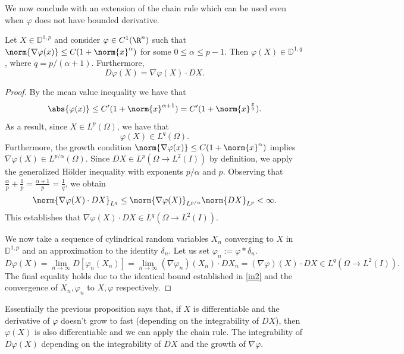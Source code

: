 \documentclass[
    a4paper,
    DIV=14,
    abstract=true,
    numbers=noenddot
]{scrartcl}
\begin{document}
We now conclude with an extension of the chain rule which can be used even when $\varphi$ does not have bounded derivative.
\begin{proposition}
	Let $X\in \mathbb{D}^{1,p}$ and consider $\varphi\in C^1(\R^n)$ such that $\norm{\nabla\varphi(x)}\leq C(1+\norm{x}^\alpha)$ for some $0\leq \alpha\leq p-1$. Then
	$\varphi(X)\in \mathbb{D}^{1,q}$, where $q=p/(\alpha+1)$. Furthermore,
	\begin{equation*}
		D\varphi(X)=\nabla \varphi(X) \cdot D X.
	\end{equation*}
\end{proposition}
\begin{proof}
    By the mean value inequality we have that
    \begin{equation*}
        \abs{\varphi(x)}\leq C'(1+\norm{x}^{\alpha+1})=C'(1+\norm{x}^{\frac{p}{q}}).
    \end{equation*}
    As a result, since $X \in L^p(\Omega)$, we have that
    \begin{equation}\label{in1}
        \varphi(X) \in L^q(\Omega).
    \end{equation}
    Furthermore, the growth condition $\norm{\nabla\varphi(x)}\leq C(1+\norm{x}^\alpha)$ implies $\nabla \varphi(X) \in L^{p/\alpha}(\Omega)$. Since $D X \in L^p(\Omega\to L^2(I))$ by definition, we apply the generalized Hölder inequality with exponents $p/\alpha$ and $p$. Observing that $\frac{\alpha}{p} + \frac{1}{p} = \frac{\alpha+1}{p} = \frac{1}{q}$, we obtain
    \begin{equation}\label{in2}
        \norm{\nabla \varphi(X) \cdot D X}_{L^q} \leq \norm{\nabla \varphi(X)}_{L^{p/\alpha}} \norm{D X}_{L^p} < \infty.
    \end{equation}
    This establishes that $\nabla \varphi(X) \cdot D X \in L^q(\Omega\to L^2(I))$.
    
    We now take a sequence of cylindrical random variables $X_n$ converging to $X$ in $\mathbb{D}^{1,p}$ and an approximation to the identity $\delta_n$. Let us set $\varphi_n:=\varphi \ast \delta_n$.
    \begin{equation*}
        D \varphi(X) = \lim_{n \to \infty} D [\varphi_n(X_n)] = \lim_{n \to \infty} (\nabla \varphi_n)(X_n)\cdot DX_n = (\nabla \varphi)(X)\cdot DX \in L^q(\Omega\to L^2(I)).
    \end{equation*}
    The final equality holds due to the identical bound established in \eqref{in2} and the convergence of $X_n,\varphi_n$ to $X,\varphi$ respectively.
\end{proof}
Essentially the previous proposition says that, if $X$ is differentiable and the derivative of $\varphi$ doesn't grow to fast (depending on the integrability of $DX$), then $\varphi(X)$ is also differentiable and we can apply the chain rule. The integrability of $D\varphi(X)$ depending on the integrability of $DX$ and the growth of $\nabla \varphi$.
\end{document}
